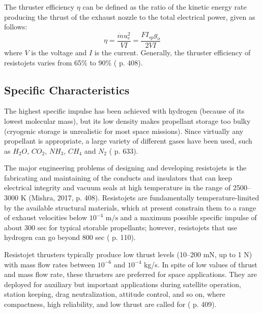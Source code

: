 The thruster efficiency $\eta$ can be defined as the ratio of the kinetic energy rate producing the thrust of the exhaust nozzle to the total electrical power, given as follows:
\begin{equation}
    \eta = \frac{\dot{m}u_e^2}{VI} = \frac{FI_{sp}g_o}{2VI}
\end{equation}
where $V$ is the voltage and $I$ is the current. Generally, the thruster efficiency of resistojets varies from 65\% to 90\% (\cite{fund_rocket_prop} p. 408).

\subsection{Specific Characteristics}
The highest specific impulse has been achieved with hydrogen (because of its lowest molecular mass), but its low density makes propellant storage too bulky (cryogenic storage is unrealistic for most space missions). Since virtually any propellant is appropriate, a large variety of different gases have been used,  such as $H_2O$, $CO_2$, $NH_3$, $CH_4$ and $N_2$ (\cite{Sutton2016-RPE9th} p. 633).

The major engineering problems of designing and developing resistojets is the fabricating and maintaining of the conducts and insulators that can keep electrical integrity and vacuum seals at high temperature in the range of 2500–3000 K (Mishra, 2017, p. 408). Resistojets are fundamentally temperature-limited by the available structural materials, which at present constrain them to a range of exhaust velocities below $10^{-4} \text{ m/s}$ and a maximum possible specific impulse of about 300 sec for typical storable propellants; however, resistojets that use hydrogen can go beyond 800 sec
(\cite{pep_book} p. 110).
 
Resistojet thrusters typically produce low thrust levels (10--200 mN, up to 1 N) with mass flow rates between $10^{-6}$ and $10^{-4}$ kg/s.
In spite of low values of thrust and mass flow rate, these thrusters are preferred for space applications. They are deployed for auxiliary but important applications during satellite operation, station keeping, drag neutralization, attitude control, and so on, where compactness, high reliability, and low thrust are called for (\cite{fund_rocket_prop} p. 409).